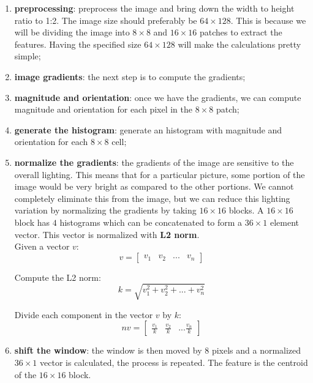 \documentclass{article}
\begin{document}
\begin{enumerate}[start=0]
    \item \textbf{preprocessing}: preprocess the image and bring down the width to height ratio to 1:2. The image size should preferably be $64\times 128$. This is because we will be dividing the image into $8\times8$ and $16\times16$ patches to extract the features. Having the specified size $64\times 128$ will make the calculations pretty simple;
    \item \textbf{image gradients}: the next step is to compute the gradients;
    \item \textbf{magnitude and orientation}: once we have the gradients, we can compute magnitude and orientation for each pixel in the $8\times 8$ patch;
    \item \textbf{generate the histogram}: generate an histogram with magnitude and orientation for each $8\times 8$ cell;
    \item \textbf{normalize the gradients}: the gradients of the image are sensitive to the overall lighting. This means that for a particular picture, some portion of the image would be very bright as compared to the other portions. We cannot completely eliminate this from the image, but we can reduce this lighting variation by normalizing the gradients by taking $16\times 16$ blocks. A $16\times 16$ block has $4$ histograms which can be concatenated to form a $36\times 1$ element vector. This vector is normalized with \textbf{L2 norm}. \\

    Given a vector $v$:
    \begin{equation*}
        v = \begin{bmatrix}
            v_1 & v_2 & ... & v_n
        \end{bmatrix}
    \end{equation*}

    Compute the L2 norm:
    \begin{equation*}
        k = \sqrt{v_1^2 + v_2^2 + ... + v_n^2}
    \end{equation*}

    Divide each component in the vector $v$ by $k$:
    \begin{equation*}
        nv = \begin{bmatrix}
            \frac{v_1}{k} & \frac{v_2}{k} & ... \frac{v_n}{k} 
        \end{bmatrix}
    \end{equation*}

    \item \textbf{shift the window}: the window is then moved by $8$ pixels and a normalized $36\times 1$ vector is calculated, the process is repeated. The feature is the centroid of the $16\times 16$ block.

\end{enumerate}
\end{document}
